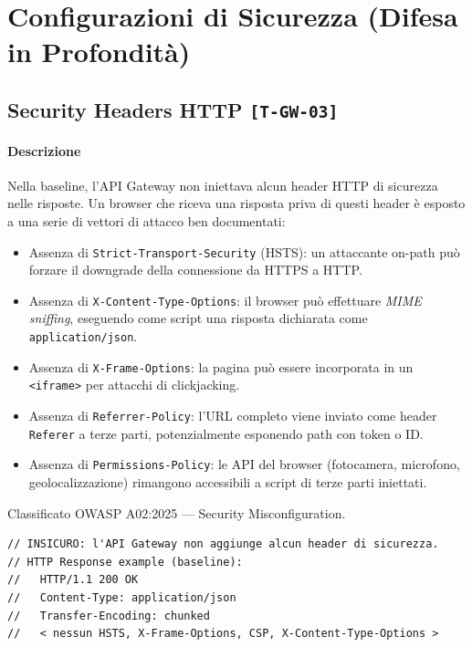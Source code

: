 ﻿\documentclass[a4paper,12pt]{report}
\newcommand{\threat}[1]{\texttt{\small\textcolor{vulnred}{[#1]}}}
\begin{document}
\section{Configurazioni di Sicurezza (Difesa in Profondità)}

\subsection{Security Headers HTTP \threat{T-GW-03}}

\paragraph{Descrizione}
Nella baseline, l'API Gateway non iniettava alcun header HTTP di sicurezza nelle risposte.
Un browser che riceva una risposta priva di questi header è esposto a una serie di vettori
di attacco ben documentati:
\begin{itemize}
  \item Assenza di \texttt{Strict-Transport-Security} (HSTS): un attaccante on-path può
        forzare il downgrade della connessione da HTTPS a HTTP.
  \item Assenza di \texttt{X-Content-Type-Options}: il browser può effettuare
        \emph{MIME sniffing}, eseguendo come script una risposta dichiarata come
        \texttt{application/json}.
  \item Assenza di \texttt{X-Frame-Options}: la pagina può essere incorporata in un
        \texttt{<iframe>} per attacchi di clickjacking.
  \item Assenza di \texttt{Referrer-Policy}: l'URL completo viene inviato come header
        \texttt{Referer} a terze parti, potenzialmente esponendo path con token o ID.
  \item Assenza di \texttt{Permissions-Policy}: le API del browser (fotocamera, microfono,
        geolocalizzazione) rimangono accessibili a script di terze parti iniettati.
\end{itemize}
Classificato OWASP A02:2025 --- Security Misconfiguration.

\begin{insecurebox}[title={Baseline vulnerabile --- nessun header di sicurezza nelle risposte}]
\begin{lstlisting}[style=java]
// INSICURO: l'API Gateway non aggiunge alcun header di sicurezza.
// HTTP Response example (baseline):
//   HTTP/1.1 200 OK
//   Content-Type: application/json
//   Transfer-Encoding: chunked
//   < nessun HSTS, X-Frame-Options, CSP, X-Content-Type-Options >
\end{lstlisting}
\end{insecurebox}
\end{document}
